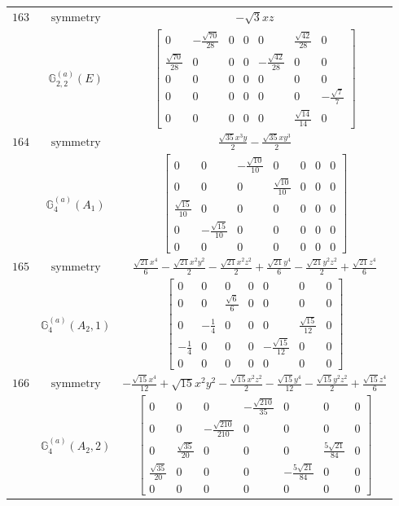 \documentclass[fleqn,8pt,landscape]{jsarticle}
\begin{document}
\begin{longtable}{ccc}
$ 163 $ & $ \text{symmetry} $ & $ - \sqrt{3} x z $ \\
$  $ & $ \mathbb{G}_{2,2}^{(a)}(E) $ & $ \begin{bmatrix} 0 & - \frac{\sqrt{70}}{28} & 0 & 0 & 0 & \frac{\sqrt{42}}{28} & 0 \\ \frac{\sqrt{70}}{28} & 0 & 0 & 0 & - \frac{\sqrt{42}}{28} & 0 & 0 \\ 0 & 0 & 0 & 0 & 0 & 0 & 0 \\ 0 & 0 & 0 & 0 & 0 & 0 & - \frac{\sqrt{7}}{7} \\ 0 & 0 & 0 & 0 & 0 & \frac{\sqrt{14}}{14} & 0 \end{bmatrix} $ \\ \hline
$ 164 $ & $ \text{symmetry} $ & $ \frac{\sqrt{35} x^{3} y}{2} - \frac{\sqrt{35} x y^{3}}{2} $ \\
$  $ & $ \mathbb{G}_{4}^{(a)}(A_{1}) $ & $ \begin{bmatrix} 0 & 0 & - \frac{\sqrt{10}}{10} & 0 & 0 & 0 & 0 \\ 0 & 0 & 0 & \frac{\sqrt{10}}{10} & 0 & 0 & 0 \\ \frac{\sqrt{15}}{10} & 0 & 0 & 0 & 0 & 0 & 0 \\ 0 & - \frac{\sqrt{15}}{10} & 0 & 0 & 0 & 0 & 0 \\ 0 & 0 & 0 & 0 & 0 & 0 & 0 \end{bmatrix} $ \\ \hline
$ 165 $ & $ \text{symmetry} $ & $ \frac{\sqrt{21} x^{4}}{6} - \frac{\sqrt{21} x^{2} y^{2}}{2} - \frac{\sqrt{21} x^{2} z^{2}}{2} + \frac{\sqrt{21} y^{4}}{6} - \frac{\sqrt{21} y^{2} z^{2}}{2} + \frac{\sqrt{21} z^{4}}{6} $ \\
$  $ & $ \mathbb{G}_{4}^{(a)}(A_{2},1) $ & $ \begin{bmatrix} 0 & 0 & 0 & 0 & 0 & 0 & 0 \\ 0 & 0 & \frac{\sqrt{6}}{6} & 0 & 0 & 0 & 0 \\ 0 & - \frac{1}{4} & 0 & 0 & 0 & \frac{\sqrt{15}}{12} & 0 \\ - \frac{1}{4} & 0 & 0 & 0 & - \frac{\sqrt{15}}{12} & 0 & 0 \\ 0 & 0 & 0 & 0 & 0 & 0 & 0 \end{bmatrix} $ \\ \hline
$ 166 $ & $ \text{symmetry} $ & $ - \frac{\sqrt{15} x^{4}}{12} + \sqrt{15} x^{2} y^{2} - \frac{\sqrt{15} x^{2} z^{2}}{2} - \frac{\sqrt{15} y^{4}}{12} - \frac{\sqrt{15} y^{2} z^{2}}{2} + \frac{\sqrt{15} z^{4}}{6} $ \\
$  $ & $ \mathbb{G}_{4}^{(a)}(A_{2},2) $ & $ \begin{bmatrix} 0 & 0 & 0 & - \frac{\sqrt{210}}{35} & 0 & 0 & 0 \\ 0 & 0 & - \frac{\sqrt{210}}{210} & 0 & 0 & 0 & 0 \\ 0 & \frac{\sqrt{35}}{20} & 0 & 0 & 0 & \frac{5 \sqrt{21}}{84} & 0 \\ \frac{\sqrt{35}}{20} & 0 & 0 & 0 & - \frac{5 \sqrt{21}}{84} & 0 & 0 \\ 0 & 0 & 0 & 0 & 0 & 0 & 0 \end{bmatrix} $ \\ \hline

\end{longtable}
\end{document}
